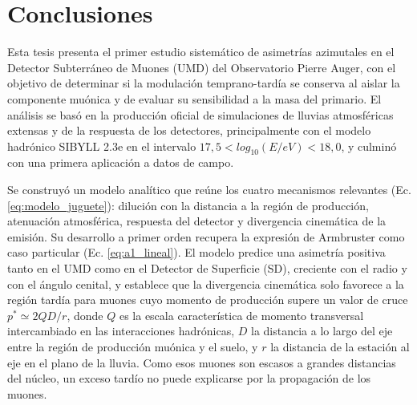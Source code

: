 
\chapter{Conclusiones}
\label{sec:conclusiones}

Esta tesis presenta el primer estudio sistemático de asimetrías azimutales en el Detector Subterráneo de Muones (UMD) del Observatorio Pierre Auger, con el objetivo de determinar si la modulación temprano-tardía se conserva al aislar la componente muónica y de evaluar su sensibilidad a la masa del primario. El análisis se basó en la producción oficial de simulaciones de lluvias atmosféricas extensas y de la respuesta de los detectores, principalmente con el modelo hadrónico SIBYLL 2.3e en el intervalo $17,5 < log_{10}(E/eV) < 18,0$, y culminó con una primera aplicación a datos de campo.

Se construyó un modelo analítico que reúne los cuatro mecanismos relevantes (Ec. \ref{eq:modelo_juguete}): dilución con la distancia a la región de producción, atenuación atmosférica, respuesta del detector y divergencia cinemática de la emisión. Su desarrollo a primer orden recupera la expresión de Armbruster como caso particular (Ec. \ref{eq:a1_lineal}). El modelo predice una asimetría positiva tanto en el UMD como en el Detector de Superficie (SD), creciente con el radio y con el ángulo cenital, y establece que la divergencia cinemática solo favorece a la región tardía para muones cuyo momento de producción supere un valor de cruce $p^* \simeq 2QD/r$, donde $Q$ es la escala característica de momento transversal intercambiado en las interacciones hadrónicas, $D$ la distancia a lo largo del eje entre la región de producción muónica y el suelo, y $r$ la distancia de la estación al eje en el plano de la lluvia. Como esos muones son escasos a grandes distancias del núcleo, un exceso tardío no puede explicarse por la propagación de los muones.

